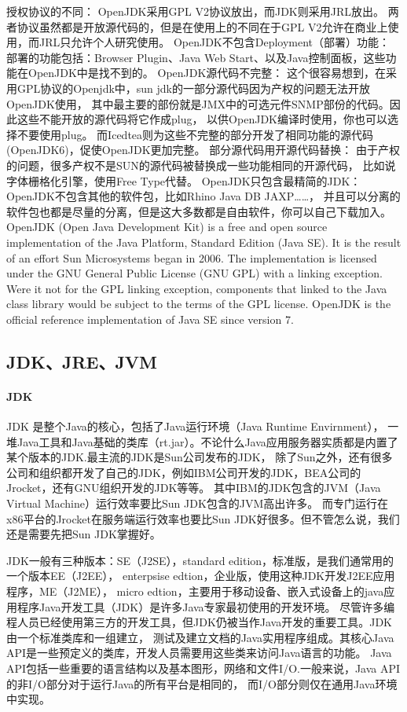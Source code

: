 \documentclass{book}
\begin{document}
授权协议的不同：
OpenJDK采用GPL V2协议放出，而JDK则采用JRL放出。
两者协议虽然都是开放源代码的，但是在使用上的不同在于GPL V2允许在商业上使用，而JRL只允许个人研究使用。
OpenJDK不包含Deployment（部署）功能：
部署的功能包括：Browser Plugin、Java Web Start、以及Java控制面板，这些功能在OpenJDK中是找不到的。
OpenJDK源代码不完整：
这个很容易想到，在采用GPL协议的Openjdk中，sun jdk的一部分源代码因为产权的问题无法开放OpenJDK使用，
其中最主要的部份就是JMX中的可选元件SNMP部份的代码。因此这些不能开放的源代码将它作成plug，
以供OpenJDK编译时使用，你也可以选择不要使用plug。
而Icedtea则为这些不完整的部分开发了相同功能的源代码(OpenJDK6)，促使OpenJDK更加完整。
部分源代码用开源代码替换：
由于产权的问题，很多产权不是SUN的源代码被替换成一些功能相同的开源代码，
比如说字体栅格化引擎，使用Free Type代替。
OpenJDK只包含最精简的JDK：
OpenJDK不包含其他的软件包，比如Rhino Java DB JAXP……，
并且可以分离的软件包也都是尽量的分离，但是这大多数都是自由软件，你可以自己下载加入。 
OpenJDK (Open Java Development Kit) is a free and open source 
implementation of the Java Platform, Standard Edition (Java SE).
It is the result of an effort Sun Microsystems began in 2006. 
The implementation is licensed under the GNU General Public 
License (GNU GPL) with a linking exception. 
Were it not for the GPL linking exception, 
components that linked to the Java class library would be subject 
to the terms of the GPL license. 
OpenJDK is the official reference implementation of Java SE since version 7.

\subsection{JDK、JRE、JVM}

\paragraph{JDK}
JDK 是整个Java的核心，包括了Java运行环境（Java Runtime Envirnment），
一堆Java工具和Java基础的类库（rt.jar）。不论什么Java应用服务器实质都是内置了某个版本的JDK.最主流的JDK是Sun公司发布的JDK，
除了Sun之外，还有很多公司和组织都开发了自己的JDK，例如IBM公司开发的JDK，BEA公司的Jrocket，还有GNU组织开发的JDK等等。
其中IBM的JDK包含的JVM（Java Virtual Machine）运行效率要比Sun JDK包含的JVM高出许多。
而专门运行在x86平台的Jrocket在服务端运行效率也要比Sun JDK好很多。但不管怎么说，我们还是需要先把Sun JDK掌握好。

JDK一般有三种版本：SE（J2SE），standard edition，标准版，是我们通常用的一个版本EE（J2EE），
enterpsise edtion，企业版，使用这种JDK开发J2EE应用程序，ME（J2ME），
micro edtion，主要用于移动设备、嵌入式设备上的java应用程序Java开发工具（JDK）是许多Java专家最初使用的开发环境。
尽管许多编程人员已经使用第三方的开发工具，但JDK仍被当作Java开发的重要工具。JDK由一个标准类库和一组建立，
测试及建立文档的Java实用程序组成。其核心Java API是一些预定义的类库，开发人员需要用这些类来访问Java语言的功能。
Java API包括一些重要的语言结构以及基本图形，网络和文件I/O.一般来说，Java API的非I/O部分对于运行Java的所有平台是相同的，
而I/O部分则仅在通用Java环境中实现。
\end{document}

